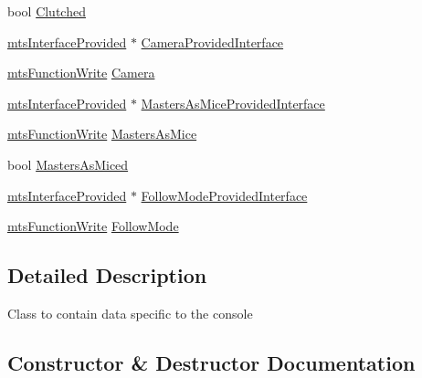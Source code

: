 \begin{DoxyCompactItemize}
\item 
bool \hyperlink{classmts_intuitive_da_vinci_1_1_console_data_aa30dc7fbf426bc18ed0a429ebaf6babb}{Clutched}
\item 
\hyperlink{classmts_interface_provided}{mts\+Interface\+Provided} $\ast$ \hyperlink{classmts_intuitive_da_vinci_1_1_console_data_ae4f60caa93b74043a0f2b28941086b6a}{Camera\+Provided\+Interface}
\item 
\hyperlink{classmts_function_write}{mts\+Function\+Write} \hyperlink{classmts_intuitive_da_vinci_1_1_console_data_ab8b191a017d61de6b19242e4e70fd33b}{Camera}
\item 
\hyperlink{classmts_interface_provided}{mts\+Interface\+Provided} $\ast$ \hyperlink{classmts_intuitive_da_vinci_1_1_console_data_a389cd1c1c61034118d6ccdcf469146df}{Masters\+As\+Mice\+Provided\+Interface}
\item 
\hyperlink{classmts_function_write}{mts\+Function\+Write} \hyperlink{classmts_intuitive_da_vinci_1_1_console_data_a1216cbd7f3906bdcdf12fa86f6cab87c}{Masters\+As\+Mice}
\item 
bool \hyperlink{classmts_intuitive_da_vinci_1_1_console_data_ae26b78b96e5a5c1f04f57be391f9e0de}{Masters\+As\+Miced}
\item 
\hyperlink{classmts_interface_provided}{mts\+Interface\+Provided} $\ast$ \hyperlink{classmts_intuitive_da_vinci_1_1_console_data_a13426aff07bb7406ae47c2328f5d62f2}{Follow\+Mode\+Provided\+Interface}
\item 
\hyperlink{classmts_function_write}{mts\+Function\+Write} \hyperlink{classmts_intuitive_da_vinci_1_1_console_data_a9f7f0469e81160170150847ae27c9de7}{Follow\+Mode}
\end{DoxyCompactItemize}


\subsection{Detailed Description}
Class to contain data specific to the console 

\subsection{Constructor \& Destructor Documentation}
\hypertarget{classmts_intuitive_da_vinci_1_1_console_data_a7b3e663d83ad3cb5b899c4fd87e30bcd}{}
